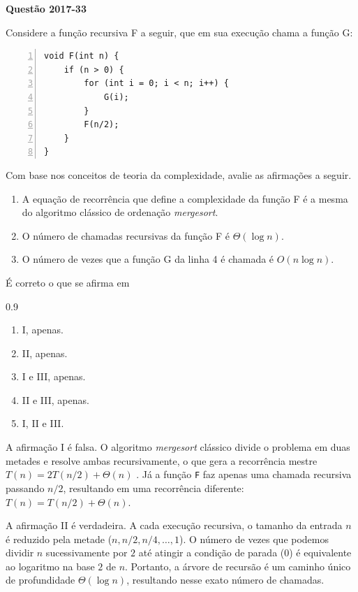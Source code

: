 \documentclass[12pt,a4paper]{article}
\newenvironment{question}[1]{%
    \pdfbookmark[3]{Questão #1}{q:#1}
    \label{q:#1}
    \bigskip\par\noindent
    \textbf{Questão #1} \dotfill
    \medskip\par\nopagebreak\noindent
    \ignorespaces
}{%
    \noindent\dotfill\medskip
}
\begin{document}
\begin{question}{2017-33}
Considere a função recursiva F a seguir, que em sua execução chama a função G:

\medskip\noindent\begin{minipage}{\linewidth}
\begin{Verbatim}[numbers=left]
void F(int n) {
    if (n > 0) {
        for (int i = 0; i < n; i++) {
            G(i);
        }
        F(n/2);
    }
}
\end{Verbatim}
\medskip
\end{minipage}

\noindent
Com base nos conceitos de teoria da complexidade, avalie as afirmações a seguir.

\begin{enumerate}[label=\Roman*.]
    \item A equação de recorrência que define a complexidade da função F é a mesma do algoritmo
    clássico de ordenação \textit{mergesort}.
    \item O número de chamadas recursivas da função F é $\Theta(\log n)$.
    \item O número de vezes que a função G da linha 4 é chamada é $O(n \log n)$.
\end{enumerate}

\noindent
É correto o que se afirma em

\begin{spacing}{0.9}
\begin{small}
\begin{enumerate}[label=\Alph*)]
    \item I, apenas.
    \item II, apenas.
    \item I e III, apenas.
    \item II e III, apenas.
    \item I, II e III.
\end{enumerate}
\end{small}
\end{spacing}
\end{question}

A afirmação I é falsa.
O algoritmo \textit{mergesort} clássico divide o problema em duas metades e resolve ambas recursivamente,
o que gera a recorrência mestre $T(n) = 2T(n/2) + \Theta(n)$ \parencite[seç.~4.5]{clrs2022}.
Já a função \texttt{F} faz apenas uma chamada recursiva passando $n/2$,
resultando em uma recorrência diferente: $T(n) = T(n/2) + \Theta(n)$.

A afirmação II é verdadeira.
A cada execução recursiva, o tamanho da entrada $n$ é reduzido pela metade ($n, n/2, n/4, \dots, 1$).
O número de vezes que podemos dividir $n$ sucessivamente por $2$ até atingir a condição de parada ($0$)
é equivalente ao logaritmo na base $2$ de $n$.
Portanto, a árvore de recursão é um caminho único de profundidade $\Theta(\log n)$, resultando nesse exato número de chamadas.
\end{document}
